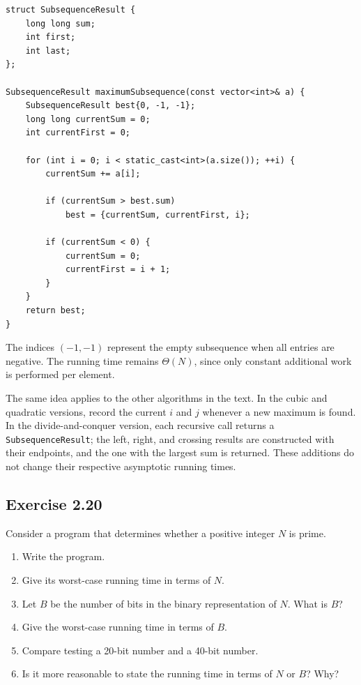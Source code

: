 \documentclass[12pt,a4paper]{article}
\begin{document}
\begin{lstlisting}
struct SubsequenceResult {
    long long sum;
    int first;
    int last;
};

SubsequenceResult maximumSubsequence(const vector<int>& a) {
    SubsequenceResult best{0, -1, -1};
    long long currentSum = 0;
    int currentFirst = 0;

    for (int i = 0; i < static_cast<int>(a.size()); ++i) {
        currentSum += a[i];

        if (currentSum > best.sum)
            best = {currentSum, currentFirst, i};

        if (currentSum < 0) {
            currentSum = 0;
            currentFirst = i + 1;
        }
    }
    return best;
}
\end{lstlisting}

The indices $(-1,-1)$ represent the empty subsequence when all entries
are negative. The running time remains $\boxed{\Theta(N)}$, since only
constant additional work is performed per element.

The same idea applies to the other algorithms in the text. In the
cubic and quadratic versions, record the current $i$ and $j$ whenever a
new maximum is found. In the divide-and-conquer version, each recursive
call returns a \texttt{SubsequenceResult}; the left, right, and crossing
results are constructed with their endpoints, and the one with the
largest sum is returned. These additions do not change their respective
asymptotic running times.

\subsection*{\color{sectionnavy}Exercise 2.20}

\noindent
Consider a program that determines whether a positive integer $N$ is
prime.

\begin{enumerate}
  \renewcommand{\labelenumi}{\alph{enumi}.}
  \item Write the program.
  \item Give its worst-case running time in terms of $N$.
  \item Let $B$ be the number of bits in the binary representation of
  $N$. What is $B$?
  \item Give the worst-case running time in terms of $B$.
  \item Compare testing a 20-bit number and a 40-bit number.
  \item Is it more reasonable to state the running time in terms of
  $N$ or $B$? Why?
\end{enumerate}
\end{document}

